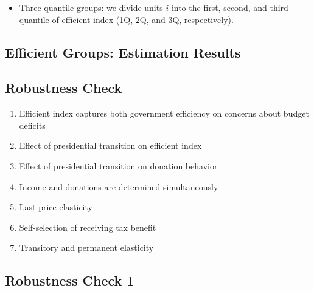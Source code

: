 \documentclass[ review  , 3p ]{elsarticle}
\providecommand{\tightlist}{%
  \setlength{\itemsep}{0pt}\setlength{\parskip}{0pt}}
\begin{document}
  \begin{itemize}
  \tightlist
  \item
    Three quantile groups: we divide units \(i\) into the first, second, and third quantile of efficient index (1Q, 2Q, and 3Q, respectively).
  \end{itemize}
  
  \hypertarget{efficient-groups-estimation-results}{%
  \subsection{Efficient Groups: Estimation Results}\label{efficient-groups-estimation-results}}
  
  \hypertarget{robustness-check-2}{%
  \subsection{Robustness Check}\label{robustness-check-2}}
  
  \begin{enumerate}
  \def\labelenumi{\arabic{enumi}.}
  \tightlist
  \item
    Efficient index captures both government efficiency on concerns about budget deficits
  \item
    Effect of presidential transition on efficient index
  \item
    Effect of presidential transition on donation behavior
  \item
    Income and donations are determined simultaneously
  \item
    Last price elasticity
  \item
    Self-selection of receiving tax benefit
  \item
    Transitory and permanent elasticity
  \end{enumerate}
  
  \hypertarget{robustness-check-1-1}{%
  \subsection{Robustness Check 1}\label{robustness-check-1-1}}
  
\end{document}
